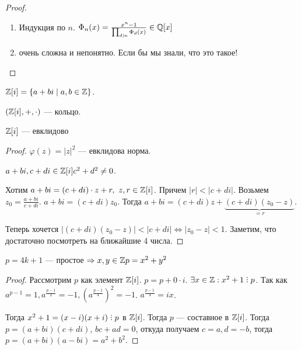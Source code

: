 \begin{proof}
    \begin{enumerate}
        \item Индукция по $n$.  $\Phi_n(x) = \frac{x^n - 1}{\prod_{d \mid n}\Phi_d(x)} \in \mathbb{Q}[x]$
        \item очень сложна и непонятно. Если бы мы знали, что это такое!
    \end{enumerate}
\end{proof}
\begin{definition}
    $\mathbb{Z}[i] = \{a + bi \mid a, b \in \mathbb{Z}\}$.
\end{definition}
\begin{statement}
    $(\mathbb{Z}[i], +, \cdot)$ --- кольцо.
\end{statement}
\begin{theorem}
    $\mathbb{Z}[i]$ --- евклидово
\end{theorem}
\begin{proof}
    $\varphi(z) = |z|^2$ --- евклидова норма.

    $a+bi, c+di \in \mathbb{Z}[i] c^2 + d^2 \neq 0$. 

    Хотим  $a+bi=(c+di)\cdot z +r,\ z,r \in \mathbb{Z}[i]$. Причем $|r| < |c+di|$. Возьмем  $z_0 = \frac{a+bi}{c+di}$. $a+bi = (c+di)z_0$. Тогда  $a+bi = (c+di)z + \underbrace{(c+di)(z_0-z)}_{=r}$. 

    Теперь хочется  $|(c+di)(z_0-z)| < |c+di| \iff |z_0 - z| < 1$. Заметим, что достаточно посмотреть на ближайшие 4 числа.
\end{proof}

\begin{theorem}
    $p = 4k + 1$ --- простое  $\Rightarrow x, y \in \mathbb{Z} p = x^2+y^2$
\end{theorem}
\begin{proof}
    Рассмотрим $p$ как элемент  $\mathbb{Z}[i]$.  $p = p + 0 \cdot i$.  $\exists x \in \Z: x^2 + 1 \divby p$. Так как  $a^{p-1} = 1, a^{\frac{p - 1}{2}} = -1, (a^{\frac{p-1}{4}})^2 = -1$. $a^{\frac{p-1}{4}} = ix$.

    Тогда $x^2+1 = (x-i)(x+i) \divby p$ в  $\mathbb{Z}[i]$. Тогда  $p$ --- составное в  $\mathbb{Z}[i]$. Тогда  $p = (a+bi)(c+di)$,  $bc + ad = 0$, откуда получаем  $c = a, d = -b$, тогда  $p = (a+bi)(a-bi) = a^2+b^2$. 
\end{proof}
